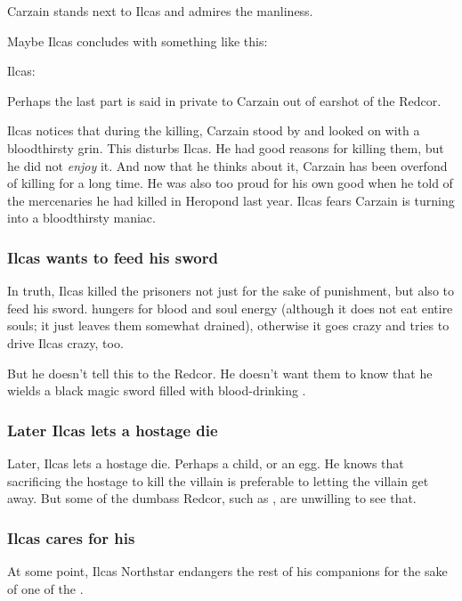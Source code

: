 Carzain stands next to Ilcas and admires the manliness. 

Maybe Ilcas concludes with something like this: 

\begin{prose}
  Ilcas: 
\end{prose}

Perhaps the last part is said in private to Carzain out of earshot of the Redcor. 

Ilcas notices that during the killing, Carzain stood by and looked on with a bloodthirsty grin. 
This disturbs Ilcas. 
He had good reasons for killing them, but he did not \emph{enjoy} it. 
And now that he thinks about it, Carzain has been overfond of killing for a long time. 
He was also too proud for his own good when he told of the mercenaries he had killed in Heropond last year. 
Ilcas fears Carzain is turning into a bloodthirsty maniac. 





\subsubsection{Ilcas wants to feed his sword}
In truth, Ilcas killed the prisoners not just for the sake of punishment, but also to feed his sword. 
\Telderain{} hungers for blood and soul energy (although it does not eat entire souls; it just leaves them somewhat drained), otherwise it goes crazy and tries to drive Ilcas crazy, too.  

But he doesn't tell this to the Redcor. 
He doesn't want them to know that he wields a black magic sword filled with blood-drinking \daemons. 





\subsubsection{Later Ilcas lets a hostage die}
Later, Ilcas lets a hostage die. 
Perhaps a child, or an egg. 
He knows that sacrificing the hostage to kill the villain is preferable to letting the villain get away. 
But some of the dumbass Redcor, such as \Racel, are unwilling to see that. 





\subsubsection{Ilcas cares for his \nycans}
At some point, Ilcas Northstar endangers the rest of his companions for the sake of one of the \nycans. 

